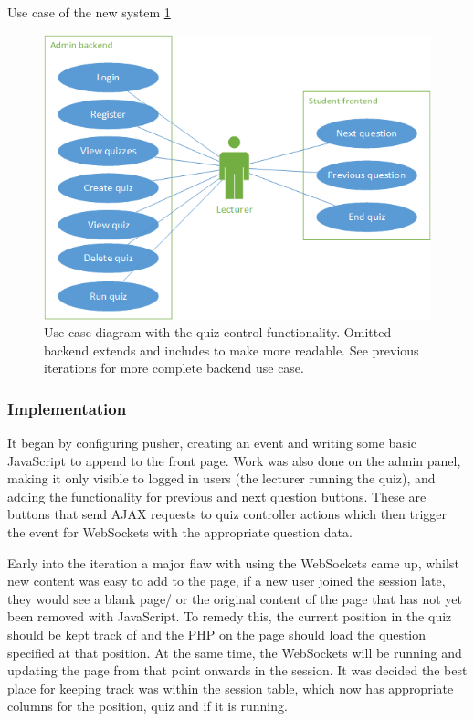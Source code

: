 Use case of the new system \ref{fig:iter-4-use-case}
\begin{figure}
	\caption{Use case diagram with the quiz control functionality. Omitted backend extends and includes to make more readable. See previous iterations for more complete backend use case.}
	\centerline{\includegraphics{Chapter2/Iter-4/iter-4-use-case}}
	\label{fig:iter-4-use-case}
\end{figure}

\subsubsection{Implementation}
It began by configuring pusher, creating an event and writing some basic JavaScript to append to the front page. Work was also done on the admin panel, making it only visible to logged in users (the lecturer running the quiz), and adding the functionality for previous and next question buttons. These are buttons that send AJAX requests to quiz controller actions which then trigger the event for WebSockets with the appropriate question data.

Early into the iteration a major flaw with using the WebSockets came up, whilst new content was easy to add to the page, if a new user joined the session late, they would see a blank page/ or the original content of the page that has not yet been removed with JavaScript. To remedy this, the current position in the quiz should be kept track of and the PHP on the page should load the question specified at that position. At the same time, the WebSockets will be running and updating the page from that point onwards in the session. It was decided the best place for keeping track was within the session table, which now has appropriate columns for the position, quiz and if it is running.

